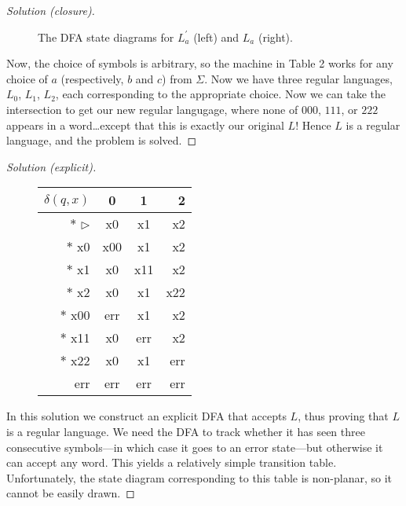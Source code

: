 \begin{proof}[Solution (closure)]
\begin{figure}[ht]
\begin{minipage}{0.48\textwidth}
\end{minipage}
\caption{The DFA state diagrams for $L_a^\prime$ (left) and $L_a$ (right).}
\end{figure}
Now, the choice of symbols is arbitrary, so the machine in Table 2 works for any choice of $a$ (respectively, $b$ and $c$) from $\Sigma$. Now we have three regular languages, $L_0$, $L_1$, $L_2$, each corresponding to the appropriate choice. Now we can take the intersection to get our new regular langugage, where none of $000$, $111$, or $222$ appears in a word\ldots except that this is exactly our original $L$! Hence $L$ is a regular language, and the problem is solved.\end{proof}
\begin{proof}[Solution (explicit)]
\begin{figure}[ht]
\centering
\setlength\tabcolsep{10pt}
\begin{tabular}{r | c | c | r}
$\delta(q, x)$   & 0   & 1   & 2   \\
\hline
$\ast$ $\rhd$    & x0  & x1  & x2  \\
$\ast$ x0        & x00 & x1  & x2  \\
$\ast$ x1        & x0  & x11 & x2  \\
$\ast$ x2        & x0  & x1  & x22 \\
$\ast$ x00       & err & x1  & x2  \\
$\ast$ x11       & x0  & err & x2  \\
$\ast$ x22       & x0  & x1  & err \\
       err       & err & err & err \\
\end{tabular}
\label{tab:ttable1c1}
\end{figure}
In this solution we construct an explicit DFA that accepts $L$, thus proving that $L$ is a regular language. We need the DFA to track whether it has seen three consecutive symbols---in which case it goes to an error state---but otherwise it can accept any word. This yields a relatively simple transition table. Unfortunately, the state diagram corresponding to this table is non-planar, so it cannot be easily drawn.
\end{proof}
